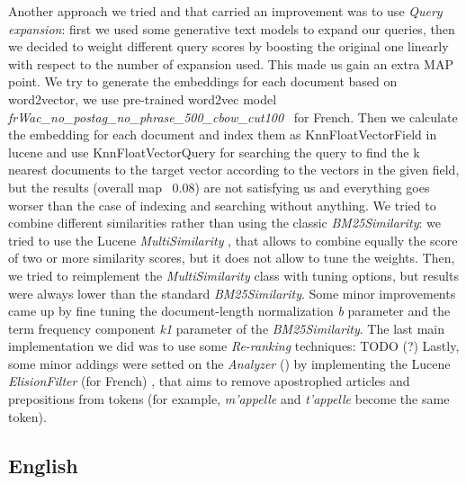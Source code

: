 Another approach we tried and that carried an improvement was to use \textit{Query expansion}: first we used some generative text models to expand our queries, then we decided to weight different query scores by boosting the original one linearly with respect to the number
of expansion used. This made us gain an extra \ac{MAP} point.
\newline
We try to generate the embeddings for each document based on word2vector, we use pre-trained word2vec model \textit{frWac\_no\_postag\_no\_phrase\_500\_cbow\_cut100}~\cite{fauconnier_2015} for French. Then we calculate the embedding for each document and index them as KnnFloatVectorField in lucene and use KnnFloatVectorQuery for searching the query to find the k nearest documents to the target vector according to the vectors in the given field, but the results (overall map ~0.08) are not satisfying us and everything goes worser than the case of indexing and searching without anything.
We tried to combine different similarities rather than using the classic \textit{BM25Similarity}: we tried to use the Lucene \textit{MultiSimilarity} \cite{lucenemultisimilarity}, that allows to combine equally the score of two or more similarity scores, but it does not allow to
tune the weights. Then, we tried to reimplement the \textit{MultiSimilarity} class with tuning options, but results were always lower than the standard \textit{BM25Similarity}. Some minor improvements came up by fine tuning the document-length
normalization \textit{b} parameter and the term frequency component \textit{k1} parameter of the \textit{BM25Similarity}.
The last main implementation we did was to use some \textit{Re-ranking} techniques: TODO (?) 
Lastly, some minor addings were setted on the \textit{Analyzer} (\cite{analyzer_subsec}) by implementing the Lucene \textit{ElisionFilter} (for French) \cite{luceneelisionfilter}, that aims to remove apostrophed articles and prepositions from tokens (for example, \textit{m'appelle} and \textit{t'appelle} become the same token).



\subsection{English}

